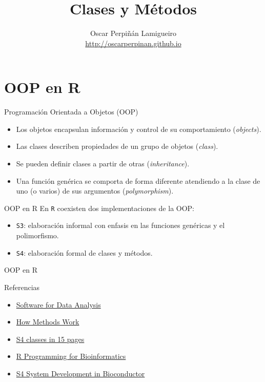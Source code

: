 \documentclass[xcolor={usenames,svgnames,dvipsnames}]{beamer}
\author{Oscar Perpiñán Lamigueiro \\ \url{http://oscarperpinan.github.io}}
\date{}
\title{Clases y Métodos}
\begin{document}
\maketitle

\section{OOP en R}
\label{sec:org9268598}

\begin{frame}[label={sec:org32f0a51}]{Programación Orientada a Objetos (OOP)}
\begin{itemize}
\item Los objetos encapsulan información y control de su comportamiento (\emph{objects}).
\item Las clases describen propiedades de un grupo de objetos (\emph{class}).
\item Se pueden definir clases a partir de otras (\emph{inheritance}).
\item Una función genérica se comporta de forma diferente atendiendo a la
clase de uno (o varios) de sus argumentos (\emph{polymorphism}).
\end{itemize}
\end{frame}
\begin{frame}[label={sec:org315da08},fragile]{OOP en R}
 En \texttt{R} coexisten dos implementaciones de la OOP:
\begin{itemize}
\item \texttt{S3}: elaboración informal con enfasis en las funciones genéricas y el polimorfismo.
\item \texttt{S4}: elaboración formal de clases y métodos.
\end{itemize}
\end{frame}
\begin{frame}[label={sec:orga14bb6f}]{OOP en R}
\begin{block}{Referencias}
\begin{center}
\begin{itemize}
\item \href{http://www.springer.com/gb/book/9780387759357}{Software for Data Analysis}
\item \href{http://developer.r-project.org/howMethodsWork.pdf}{How Methods Work}
\item \href{http://www.stat.auckland.ac.nz/S-Workshop/Gentleman/S4Objects.pdf}{S4 classes in 15 pages}
\item \href{http://bioconductor.org/help/publications/books/r-programming-for-bioinformatics/}{R Programming for Bioinformatics }
\item \href{http://bioconductor.org/help/course-materials/2010/AdvancedR/S4InBioconductor.pdf}{S4 System Development in Bioconductor}
\end{itemize}
\end{center}
\end{block}
\end{frame}
\end{document}
